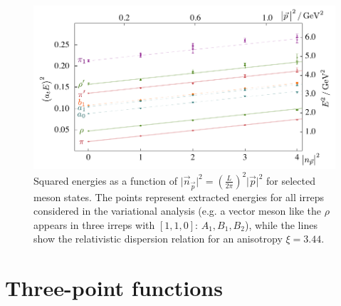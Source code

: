 \documentclass[twocolumn,amsmath,amssymb,prd,10pt,floatfix, 
superscriptaddress,nofootinbib, showpacs, preprintnumbers]{revtex4-1}
\begin{document}
\begin{figure}[h]
\includegraphics[width=1.0\linewidth]{fig4.pdf}
\caption{Squared energies as a function of $\lvert \vec{n}_{\vec{p}} \rvert^2 =  (\tfrac{L}{2\pi})^2\lvert \vec{p} \rvert^2  $ for selected meson states. The points represent extracted energies for all irreps considered in the variational analysis (e.g. a vector meson like the $\rho$ appears in three irreps with $[1,1,0]$: $A_1, B_1, B_2$), while the lines show the relativistic dispersion relation for an anisotropy $\xi=3.44$. \label{fig::Dispersion}}
\end{figure}





%
\section{Three-point functions\label{sec::three-point}}
\end{document}
